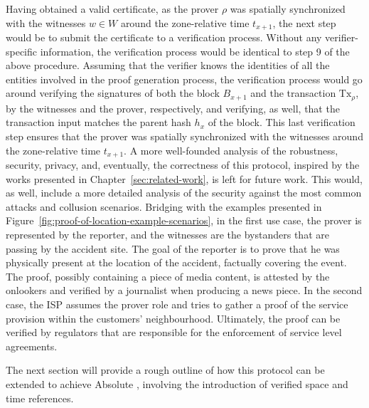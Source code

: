 Having obtained a valid \pol{} certificate, as the prover $\rho$ was spatially synchronized with the witnesses $w \in W$ around the zone-relative time $t_{x+1}$, the next step would be to submit the certificate to a verification process. Without any verifier-specific information, the verification process would be identical to step 9 of the above procedure. Assuming that the verifier knows the identities of all the entities involved in the proof generation process, the verification process would go around verifying the signatures of both the block $B_{x+1}$ and the transaction $\text{Tx}_\rho$, by the witnesses and the prover, respectively, and verifying, as well, that the transaction input matches the parent hash $h_{x}$ of the block. This last verification step ensures that the prover was spatially synchronized with the witnesses around the zone-relative time $t_{x+1}$. A more well-founded analysis of the robustness, security, privacy, and, eventually, the correctness of this \pol{} protocol, inspired by the works presented in Chapter~\ref{sec:related-work}, is left for future work. This would, as well, include a more detailed analysis of the security against the most common attacks and collusion scenarios. Bridging with the examples presented in Figure~\ref{fig:proof-of-location-example-scenarios}, in the first use case, the prover is represented by the reporter, and the witnesses are the bystanders that are passing by the accident site. The goal of the reporter is to prove that he was physically present at the location of the accident, factually covering the event. The proof, possibly containing a piece of media content, is attested by the onlookers and verified by a journalist when producing a news piece. In the second case, the ISP assumes the prover role and tries to gather a proof of the service provision within the customers' neighbourhood. Ultimately, the proof can be verified by regulators that are responsible for the enforcement of service level agreements. 

The next section will provide a rough outline of how this protocol can be extended to achieve Absolute \pol{}, involving the introduction of verified space and time references.